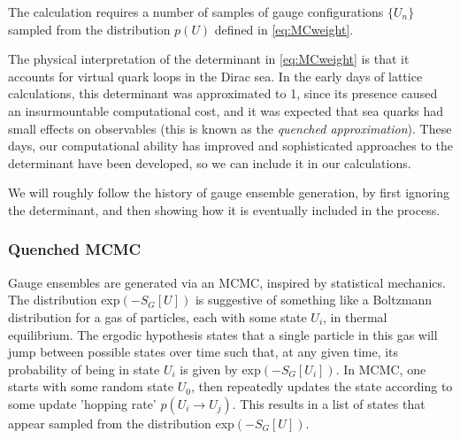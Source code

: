 The calculation requires a number of samples of gauge configurations $\{U_n\}$ sampled from the distribution $p(U)$ defined in \eqref{eq:MCweight}.

The physical interpretation of the determinant in \eqref{eq:MCweight} is that it accounts for virtual quark loops in the Dirac sea. In the early days of lattice calculations, this determinant was approximated to 1, since its presence caused an insurmountable computational cost, and it was expected that sea quarks had small effects on observables (this is known as the {\it{quenched approximation}}). These days, our computational ability has improved and sophisticated approaches to the determinant have been developed, so we can include it in our calculations.

We will roughly follow the history of gauge ensemble generation, by first ignoring the determinant, and then showing how it is eventually included in the process.

\subsubsection{Quenched MCMC}

Gauge ensembles are generated via an MCMC, inspired by statistical mechanics. The distribution exp$(-S_G[U])$ is suggestive of something like a Boltzmann distribution for a gas of particles, each with some state $U_i$, in thermal equilibrium. The ergodic hypothesis states that a single particle in this gas will jump between possible states over time such that, at any given time, its probability of being in state $U_i$ is given by exp$(-S_G[U_i])$. In MCMC, one starts with some random state $U_0$, then repeatedly updates the state according to some update 'hopping rate' $p(U_i\to U_j)$. This results in a list of states that appear sampled from the distribution exp$(-S_G[U])$.

